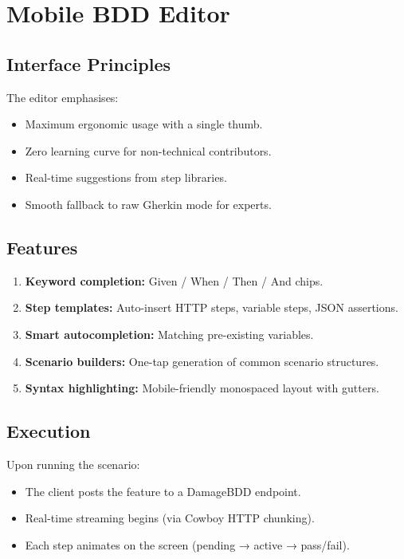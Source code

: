 \documentclass[12pt,a4paper]{article}
\begin{document}
\section{Mobile BDD Editor}

\subsection{Interface Principles}

The editor emphasises:
\begin{itemize}
    \item Maximum ergonomic usage with a single thumb.
    \item Zero learning curve for non-technical contributors.
    \item Real-time suggestions from step libraries.
    \item Smooth fallback to raw Gherkin mode for experts.
\end{itemize}

\subsection{Features}

\begin{enumerate}[leftmargin=1.2cm]
    \item \textbf{Keyword completion:} Given / When / Then / And chips.
    \item \textbf{Step templates:} Auto-insert HTTP steps, variable steps, JSON assertions.
    \item \textbf{Smart autocompletion:} Matching pre-existing variables.
    \item \textbf{Scenario builders:} One-tap generation of common scenario structures.
    \item \textbf{Syntax highlighting:} Mobile-friendly monospaced layout with gutters.
\end{enumerate}

\subsection{Execution}

Upon running the scenario:
\begin{itemize}
    \item The client posts the feature to a DamageBDD endpoint.
    \item Real-time streaming begins (via Cowboy HTTP chunking).
    \item Each step animates on the screen (pending → active → pass/fail).
\end{itemize}
\end{document}
